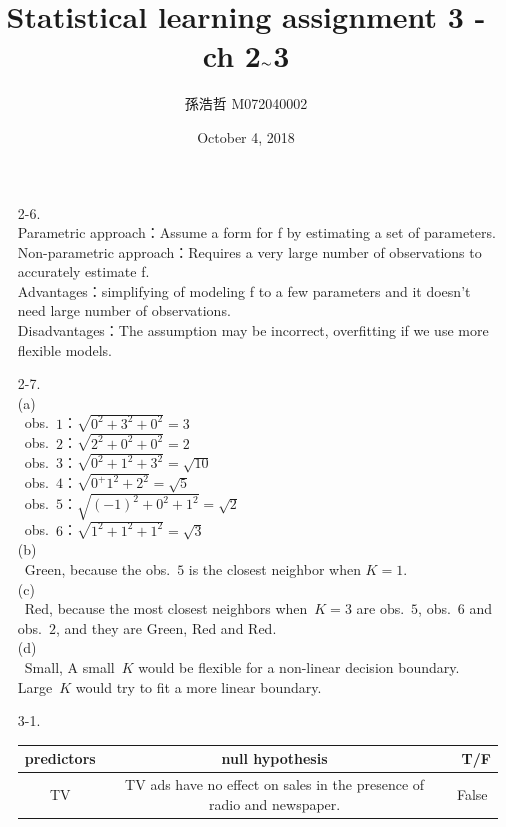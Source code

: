 \documentclass[12pt]{article}
\title{Statistical learning assignment 3 - ch 2$\thicksim$3}
\author{孫浩哲 \hspace{0.7cm} M072040002}
\date{October 4, 2018}
\begin{document}
\maketitle
\begin{itemize}
\item[\Large2-6.]
\ \\
\normalsize
Parametric approach：Assume a form for f by estimating a set of parameters.\\[3ex]
Non-parametric approach：Requires a very large number of observations to accurately estimate f.\\[3ex]
Advantages：simplifying of modeling f to a few parameters and it doesn't need large number of observations.\\[3ex]
Disadvantages：The assumption may be incorrect, overfitting if we use more flexible models.
\item[\Large2-7.]
\ \\
\normalsize
(a)\\[2ex]
\ obs.\ $1$：$\sqrt{0^2+3^2+0^2}=3$\\[2ex]
\ obs.\ $2$：$\sqrt{2^2+0^2+0^2}=2$\\[2ex]
\ obs.\ $3$：$\sqrt{0^2+1^2+3^2}=\sqrt{10}$\\[2ex]
\ obs.\ $4$：$\sqrt{0^+1^2+2^2}=\sqrt{5}$\\[2ex]
\ obs.\ $5$：$\sqrt{(-1)^2+0^2+1^2}=\sqrt{2}$\\[2ex]
\ obs.\ $6$：$\sqrt{1^2+1^2+1^2}=\sqrt{3}$\\[5ex]
(b)\\[2ex]
\ Green, because the obs.\ $5$ is the closest neighbor when $K=1$.\\[5ex]
(c)\\[2ex]
\ Red, because the most closest neighbors when\ $K=3$ are obs.\ $5$, obs.\ $6$ and obs.\ $2$, and they are Green, Red and Red.\\[5ex]
(d)\\[2ex]
\ Small, A small\ $K$ would be flexible for a non-linear decision boundary.\\
Large\ $K$ would try to fit a more linear boundary.
\item[\Large3-1.]
\ \\
\normalsize
\begin{table}[h]
  \raggedright
  \begin{tabular}{|c|c|c|}
  \hline
   predictors & null hypothesis &\ T/F \\
   \hline
   TV & TV ads have no effect on sales in the presence of radio and newspaper.& False \\

\end{tabular}
\end{table}
\end{itemize}
\end{document}
